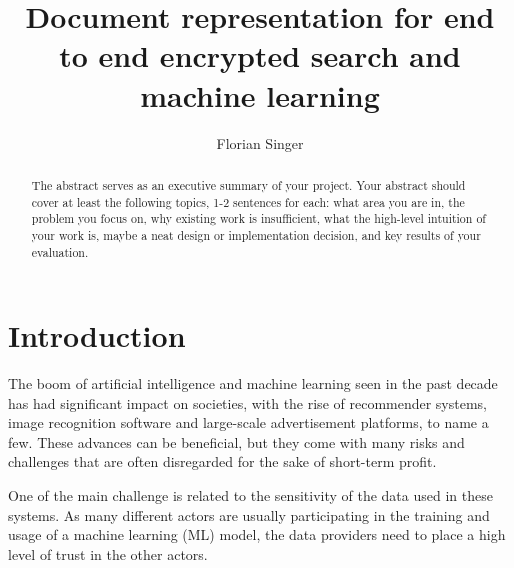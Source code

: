 \documentclass[a4paper,11pt,oneside]{report}
\title{Document representation for end to end encrypted search and machine learning}
\author{Florian Singer}
\begin{document}
\maketitle

\begin{abstract}
The abstract serves as an executive summary of your project.
Your abstract should cover at least the following topics, 1-2 sentences for
each: what area you are in, the problem you focus on, why existing work is
insufficient, what the high-level intuition of your work is, maybe a neat
design or implementation decision, and key results of your evaluation.
\end{abstract}

\maketoc


\chapter{Introduction}



The boom of artificial intelligence and machine learning seen in the past decade has had significant impact on societies, with the rise of recommender systems, image recognition software and large-scale advertisement platforms, to name a few. These advances can be beneficial, but they come with many risks and challenges that are often disregarded for the sake of short-term profit.

One of the main challenge is related to the sensitivity of the data used in these systems. As many different actors are usually participating in the training and usage of a machine learning (ML) model, the data providers need to place a high level of trust in the other actors.
\end{document}
